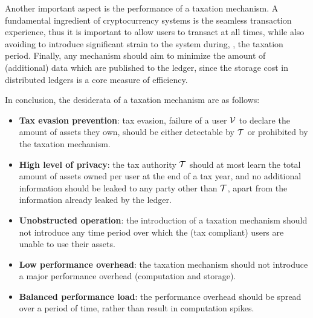 Another important aspect is the performance of a taxation mechanism.  A
fundamental ingredient of cryptocurrency systems is the seamless transaction
experience, thus it is important to allow users to transact at all times, while
also avoiding to introduce significant strain to the system during, \eg, the
taxation period. Finally, any mechanism should aim to minimize the amount of
(additional) data which are published to the ledger, since the storage cost in
distributed ledgers is a core measure of efficiency.

In conclusion, the desiderata of a taxation mechanism are as follows:
\begin{itemize}
    \item \textbf{Tax evasion prevention}: tax evasion, \ie failure of a user
        $\mathcal{V}$ to declare the amount of assets they own, should be either
        detectable by $\mathcal{T}$ or prohibited by the taxation mechanism.
    \item \textbf{High level of privacy}: the tax authority $\mathcal{T}$ should
        at most learn the total amount of assets owned per user at the end of a
        tax year, and no additional information should be leaked to any party
        other than $\mathcal{T}$, apart from the information already leaked by
        the ledger.
    \item \textbf{Unobstructed operation}: the introduction of a taxation
        mechanism should not introduce any time period over which the (tax
        compliant) users are unable to use their assets.
    \item \textbf{Low performance overhead}: the taxation mechanism should not
        introduce a major performance overhead (\ie computation and storage).
    \item \textbf{Balanced performance load}: the performance overhead should
        be spread over a period of time, rather than result in computation
        spikes.
\end{itemize}

